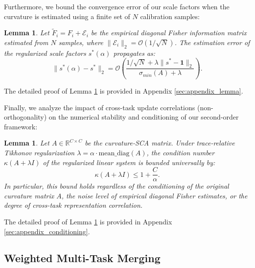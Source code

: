 \documentclass{article}
\theoremstyle{plain}
\newtheorem{lemma}[theorem]{Lemma}
\theoremstyle{definition}
\theoremstyle{remark}
\begin{document}
Furthermore, we bound the convergence error of our scale factors when the curvature is estimated using a finite set of $N$ calibration samples:
\begin{lemma}
Let $\tilde{F}_i = F_i + \mathcal{E}_i$ be the empirical diagonal Fisher information matrix estimated from $N$ samples, where $\|\mathcal{E}_i\|_2 = \mathcal{O}(1/\sqrt{N})$. The estimation error of the regularized scale factors $s^*(\alpha)$ propagates as:
\begin{equation}
    \|s^*(\alpha) - s^*\|_2 = \mathcal{O}\left( \frac{1 / \sqrt{N} + \lambda \|s^* - \mathbf{1}\|_2}{\sigma_{min}(A) + \lambda} \right).
\end{equation}
\label{lem:estimation_bounds}
\end{lemma}
The detailed proof of Lemma \ref{lem:estimation_bounds} is provided in Appendix \ref{sec:appendix_lemma}.

Finally, we analyze the impact of cross-task update correlations (non-orthogonality) on the numerical stability and conditioning of our second-order framework:
\begin{lemma}
Let $A \in \mathbb{R}^{C \times C}$ be the curvature-SCA matrix. Under trace-relative Tikhonov regularization $\lambda = \alpha \cdot \text{mean\_diag}(A)$, the condition number $\kappa(A + \lambda I)$ of the regularized linear system is bounded universally by:
\begin{equation}
    \kappa(A + \lambda I) \le 1 + \frac{C}{\alpha}.
\end{equation}
In particular, this bound holds regardless of the conditioning of the original curvature matrix $A$, the noise level of empirical diagonal Fisher estimates, or the degree of cross-task representation correlation.
\label{lem:spectral_conditioning}
\end{lemma}
The detailed proof of Lemma \ref{lem:spectral_conditioning} is provided in Appendix \ref{sec:appendix_conditioning}.

\subsection{Weighted Multi-Task Merging}
\label{subsec:weighted}
\end{document}
